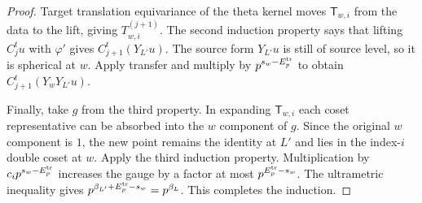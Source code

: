 \begin{proof}
Target translation equivariance of the theta kernel moves $\mathsf T_{w,i}$ from the data to the lift, giving $T_{w,i}^{(j+1)}$. The second induction property says that lifting $C_j^tu$ with $\varphi'$ gives $C_{j+1}^t(Y_{L'}u)$. The source form $Y_{L'}u$ is still of source level, so it is spherical at $w$. Apply transfer and multiply by $p^{s_w-E_p^{\rm tr}}$ to obtain $C_{j+1}^t(Y_wY_{L'}u)$.

Finally, take $g$ from the third property. In expanding $\mathsf T_{w,i}$ each coset representative can be absorbed into the $w$ component of $g$. Since the original $w$ component is $1$, the new point remains the identity at $L'$ and lies in the index-$i$ double coset at $w$. Apply the third induction property. Multiplication by $c_i p^{s_w-E_p^{\rm tr}}$ increases the gauge by a factor at most $p^{E_p^{\rm tr}-s_w}$. The ultrametric inequality gives
$p^{\beta_{L'}+E_p^{\rm tr}-s_w}=p^{\beta_L}$. This completes the induction.
\end{proof}

